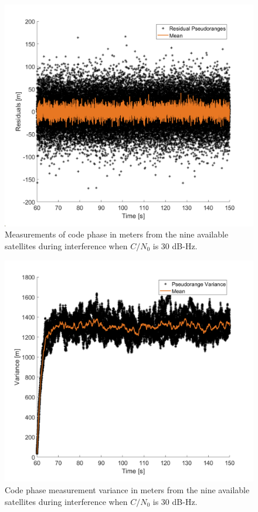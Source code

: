 \documentclass[12pt]{report}
\begin{document}
\begin{figure}[!ht]
  \centering
  \includegraphics[width=0.75\linewidth]{Figures/Results/Scenario1/Case30/codephase.png}
  \caption{Measurements of code phase in meters from the nine available satellites during interference when \(C/N_0\) is \(30\) dB-Hz.}\label{fig:codephase30}
\end{figure}

\begin{figure}[!ht]
  \centering
  \includegraphics[width=0.75\linewidth]{Figures/Results/Scenario1/Case30/codeVariance.png}
  \caption{Code phase measurement variance in meters from the nine available satellites during interference when \(C/N_0\) is \(30\) dB-Hz.}\label{fig:codephaseVariance30}
\end{figure}
\end{document}
